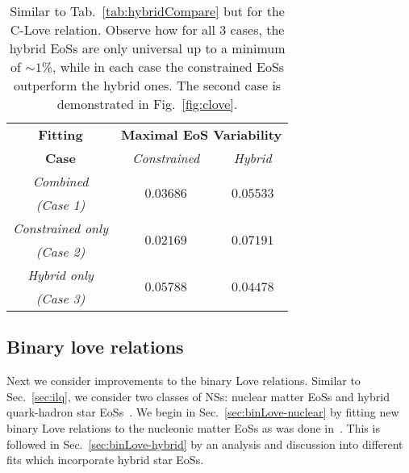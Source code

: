\documentclass[prd,twocolumn,nofootinbib,superscriptaddress,amsmath,amssymb]{revtex4-1}
\begin{document}
\begin{table}
\centering
\caption{
Similar to Tab.~\ref{tab:hybridCompare} but for the C-Love relation.
Observe how for all 3 cases, the hybrid EoSs are only universal up to a minimum of $\sim1$\%, while in each case the constrained EoSs outperform the hybrid ones.
The second case is demonstrated in Fig.~\ref{fig:clove}.
}\label{tab:hybridCompareClove}
\begin{tabular}{ c  || c c } 
 \hline
 \hline
 \textbf{Fitting} & \multicolumn{2}{c}{\textbf{Maximal EoS Variability}} \\
 \cline{2-3}
 \textbf{Case} &  \multicolumn{1}{c|}{\emph{Constrained}} & \emph{Hybrid}\\
 \hline
 \emph{Combined} &  \multirow{2}{*}{$0.03686$} & \multirow{2}{*}{$0.05533$}\\
 \emph{(Case 1)} & &\\
 \cline{1-1}
 \emph{Constrained only} & \multirow{2}{*}{$0.02169$} & \multirow{2}{*}{$0.07191$}\\
  \emph{(Case 2)} & &\\
  \cline{1-1}
 \emph{Hybrid only} & \multirow{2}{*}{$0.05788$} & \multirow{2}{*}{$0.04478$}\\
  \emph{(Case 3)} & &\\
  \cline{1-1}
\hline
\hline
\end{tabular}
\end{table}

\subsection{Binary love relations}\label{sec:binary}
Next we consider improvements to the binary Love relations.
Similar to Sec.~\ref{sec:ilq}, we consider two classes of NSs: nuclear matter EoSs and hybrid quark-hadron star EoSs~\cite{Paschalidis2018,Alford:2017qgh,1971SvA....15..347S,Zdunik:2012dj,Alford:2013aca}.
We begin in Sec.~\ref{sec:binLove-nuclear} by fitting new binary Love relations to the nucleonic matter EoSs as was done in~\cite{Yagi:binLove}.
This is followed in Sec.~\ref{sec:binLove-hybrid} by an analysis and discussion into different fits which incorporate hybrid star EoSs.
\end{document}
